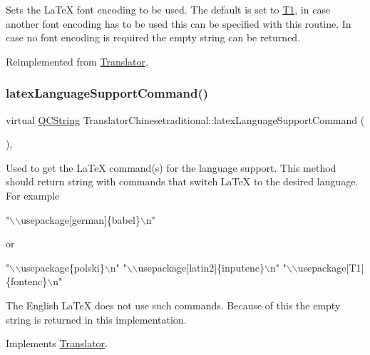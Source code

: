 Sets the La\+TeX font encoding to be used. The default is set to {\ttfamily \mbox{\hyperlink{class_t1}{T1}}}, in case another font encoding has to be used this can be specified with this routine. In case no font encoding is required the empty string can be returned. 

Reimplemented from \mbox{\hyperlink{class_translator_a573b483369d8d7cf7d85831a9da356be}{Translator}}.

\mbox{\label{class_translator_chinesetraditional_a61b66ec8d48398beab664080f41f30b0}} 
\subsubsection{\texorpdfstring{latexLanguageSupportCommand()}{latexLanguageSupportCommand()}}
{\footnotesize\ttfamily virtual \mbox{\hyperlink{class_q_c_string}{Q\+C\+String}} Translator\+Chinesetraditional\+::latex\+Language\+Support\+Command (\begin{DoxyParamCaption}{ }\end{DoxyParamCaption})\hspace{0.3cm}{\ttfamily [inline]}, {\ttfamily [virtual]}}

Used to get the La\+TeX command(s) for the language support. This method should return string with commands that switch La\+TeX to the desired language. For example 
\begin{DoxyPre}"\(\backslash\)\(\backslash\)usepackage[german]\{babel\}\(\backslash\)n"
 \end{DoxyPre}
 or 
\begin{DoxyPre}"\(\backslash\)\(\backslash\)usepackage\{polski\}\(\backslash\)n"
 "\(\backslash\)\(\backslash\)usepackage[latin2]\{inputenc\}\(\backslash\)n"
 "\(\backslash\)\(\backslash\)usepackage[T1]\{fontenc\}\(\backslash\)n"
 \end{DoxyPre}


The English La\+TeX does not use such commands. Because of this the empty string is returned in this implementation. 

Implements \mbox{\hyperlink{class_translator}{Translator}}.

\mbox{\label{class_translator_chinesetraditional_a84f0a69aa5ba86bf01b893606a7fe9a4}} 
